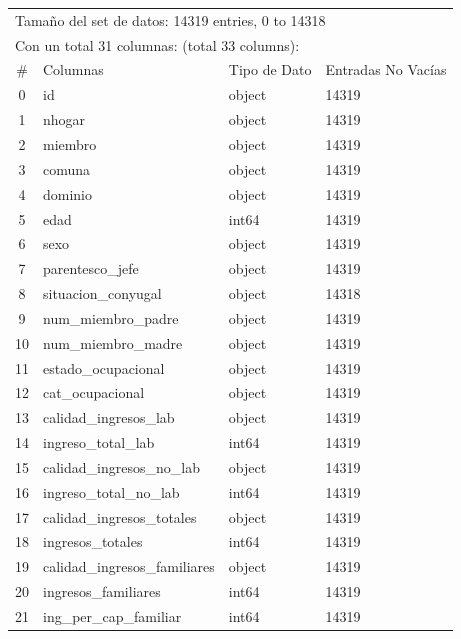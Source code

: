 \documentclass[a4paper]{article}
\begin{document}
    \begin{table}[H]
        \centering
        \begin{tabular}{clll}
            \multicolumn{4}{l}{Tamaño del set de datos: 14319 entries, 0 to 14318} \\
            \multicolumn{4}{l}{Con un total 31 columnas: (total 33 columns):} \\
            \#  & Columnas & Tipo de Dato & Entradas No Vacías \\ \hline
            0   & id & object & 14319 \\ 
            1   & nhogar & object & 14319 \\ 
            2   & miembro & object & 14319 \\ 
            3   & comuna & object & 14319 \\ 
            4   & dominio & object & 14319 \\ 
            5   & edad & int64 & 14319 \\ 
            6   & sexo & object & 14319 \\ 
            7   & parentesco\_jefe & object & 14319 \\ 
            8   & situacion\_conyugal & object & 14318 \\ 
            9   & num\_miembro\_padre & object & 14319 \\ 
            10  & num\_miembro\_madre & object & 14319 \\ 
            11  & estado\_ocupacional & object & 14319 \\ 
            12  & cat\_ocupacional & object & 14319 \\ 
            13  & calidad\_ingresos\_lab & object & 14319 \\ 
            14  & ingreso\_total\_lab & int64 & 14319 \\ 
            15  & calidad\_ingresos\_no\_lab & object & 14319 \\ 
            16  & ingreso\_total\_no\_lab & int64 & 14319 \\ 
            17  & calidad\_ingresos\_totales & object & 14319 \\ 
            18  & ingresos\_totales & int64 & 14319 \\ 
            19  & calidad\_ingresos\_familiares & object & 14319 \\ 
            20  & ingresos\_familiares & int64 & 14319 \\ 
            21  & ing\_per\_cap\_familiar & int64 & 14319 \\ 

\end{tabular}
\end{table}
\end{document}
